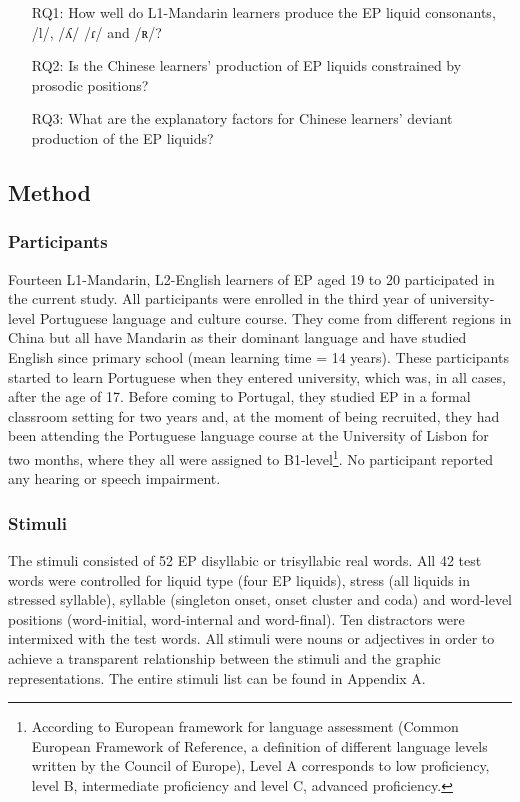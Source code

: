\documentclass[output=paper]{../langscibook}
\begin{document}
\begin{itemize}
\item[RQ1:] How well do L1-Mandarin learners produce the EP liquid consonants, /l/, /ʎ/ /ɾ/ and /ʀ/?
\item[RQ2:] Is the Chinese learners’ production of EP liquids constrained by prosodic positions?
\item[RQ3:] What are the explanatory factors for Chinese learners’ deviant production of the EP liquids?
\end{itemize}

\subsection{Method}

\subsubsection{Participants}


Fourteen L1-Mandarin, L2-English learners of EP aged 19 to 20 participated in the current study. All participants were enrolled in the third year of university-level Portuguese language and culture course. They come from different regions in China but all have Mandarin as their dominant language and have studied English since primary school (mean learning time = 14 years). These participants started to learn Portuguese when they entered university, which was, in all cases, after the age of 17. Before coming to Portugal, they studied EP in a formal classroom setting for two years and, at the moment of being recruited, they had been attending the Portuguese language course at the University of Lisbon for two months, where they all were assigned to B1-level\footnote{According to European framework for language assessment (Common European Framework of Reference, a definition of different language levels written by the Council of Europe), Level A corresponds to low proficiency, level B, intermediate proficiency and level C, advanced proficiency.}. No participant reported any hearing or speech impairment.


\subsubsection{Stimuli}


The stimuli consisted of 52 EP disyllabic or trisyllabic real words. All 42 test words were controlled for liquid type (four EP liquids), stress (all liquids in stress\-ed syllable), syllable (singleton onset, onset cluster and coda) and word-level positions (word-initial, word-internal and word-final). Ten distractors were intermixed with the test words. All stimuli were nouns or adjectives in order to achieve a transparent relationship between the stimuli and the graphic representations. The entire stimuli list can be found in Appendix A.
\end{document}
